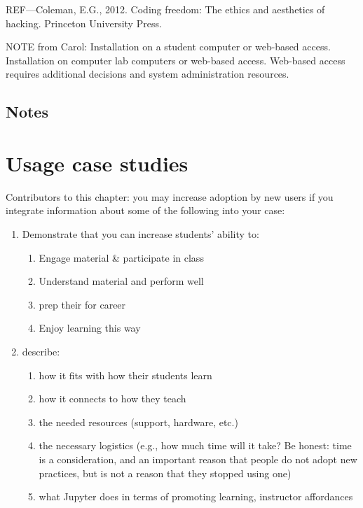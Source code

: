 \documentclass[]{book}
\providecommand{\tightlist}{%
  \setlength{\itemsep}{0pt}\setlength{\parskip}{0pt}}
\begin{document}
REF---Coleman, E.G., 2012. Coding freedom: The ethics and aesthetics of
hacking. Princeton University Press.

NOTE from Carol: Installation on a student computer or web-based access.
Installation on computer lab computers or web-based access. Web-based
access requires additional decisions and system administration
resources.

\section{Notes}\label{notes}

\chapter{Usage case studies}\label{case-studies}

Contributors to this chapter: you may increase adoption by new users if
you integrate information about some of the following into your case:

\begin{enumerate}
\def\labelenumi{\arabic{enumi}.}
\tightlist
\item
  Demonstrate that you can increase students' ability to:

  \begin{enumerate}
  \def\labelenumii{\arabic{enumii}.}
  \tightlist
  \item
    Engage material \& participate in class
  \item
    Understand material and perform well
  \item
    prep their for career
  \item
    Enjoy learning this way
  \end{enumerate}
\item
  describe:

  \begin{enumerate}
  \def\labelenumii{\arabic{enumii}.}
  \tightlist
  \item
    how it fits with how their students learn
  \item
    how it connects to how they teach
  \item
    the needed resources (support, hardware, etc.)
  \item
    the necessary logistics (e.g., how much time will it take? Be
    honest: time is a consideration, and an important reason that people
    do not adopt new practices, but is not a reason that they stopped
    using one)
  \item
    what Jupyter does in terms of promoting learning, instructor
    affordances
  \end{enumerate}
\end{enumerate}
\end{document}
